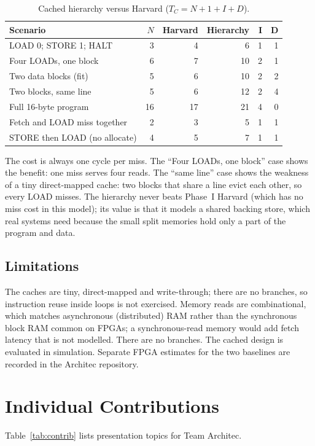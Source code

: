 \documentclass[conference,a4paper]{IEEEtran}
\begin{document}
\begin{table}[t]
\caption{Cached hierarchy versus Harvard ($T_C=N+1+I+D$).}
\label{tab:hier}
\centering
\setlength{\tabcolsep}{3pt}
\begin{tabular}{lrrrrr}
\hline
Scenario & $N$ & Harvard & Hierarchy & I & D \\ \hline
LOAD 0; STORE 1; HALT & 3 & 4 & 6 & 1 & 1 \\
Four LOADs, one block & 6 & 7 & 10 & 2 & 1 \\
Two data blocks (fit) & 5 & 6 & 10 & 2 & 2 \\
Two blocks, same line & 5 & 6 & 12 & 2 & 4 \\
Full 16-byte program & 16 & 17 & 21 & 4 & 0 \\
Fetch and LOAD miss together & 2 & 3 & 5 & 1 & 1 \\
STORE then LOAD (no allocate) & 4 & 5 & 7 & 1 & 1 \\ \hline
\end{tabular}
\end{table}

The cost is always one cycle per miss. The ``Four LOADs, one block'' case
shows the benefit: one miss serves four reads. The ``same line'' case shows
the weakness of a tiny direct-mapped cache: two blocks that share a line evict
each other, so every LOAD misses. The hierarchy never beats Phase~I Harvard
(which has no miss cost in this model); its value is that it models a shared
backing store, which real systems need because the small split memories hold
only a part of the program and data.

\subsection{Limitations}
The caches are tiny, direct-mapped and write-through; there are no branches, so
instruction reuse inside loops is not exercised. Memory reads are combinational, which matches asynchronous (distributed)
RAM rather than the synchronous block RAM common on FPGAs; a
synchronous-read memory would add fetch latency that is not modelled.
There are no branches. The cached design is evaluated in simulation. Separate FPGA estimates for the two baselines are recorded in the Architec repository.

\section{Individual Contributions}
Table~\ref{tab:contrib} lists presentation topics for Team Architec.
\end{document}
